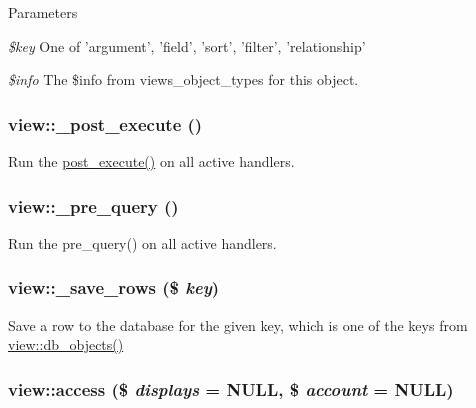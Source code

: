 \begin{DoxyParams}{Parameters}
\item[{\em \$key}]One of 'argument', 'field', 'sort', 'filter', 'relationship' \item[{\em \$info}]The \$info from views\_\-object\_\-types for this object. \end{DoxyParams}
\hypertarget{classview_ad6c1a54c6fe9fc3c32629e575c58ad21}{
\subsubsection[{\_\-post\_\-execute}]{\setlength{\rightskip}{0pt plus 5cm}view::\_\-post\_\-execute ()}}
\label{classview_ad6c1a54c6fe9fc3c32629e575c58ad21}
Run the \hyperlink{classview_ac541f5588453cd52ce0b5c0e0b3443f4}{post\_\-execute()} on all active handlers. \hypertarget{classview_a882fc1813823b4fa361748edaae121ee}{
\subsubsection[{\_\-pre\_\-query}]{\setlength{\rightskip}{0pt plus 5cm}view::\_\-pre\_\-query ()}}
\label{classview_a882fc1813823b4fa361748edaae121ee}
Run the pre\_\-query() on all active handlers. \hypertarget{classview_ac54578fd717de9be8c127add6e869bc2}{
\subsubsection[{\_\-save\_\-rows}]{\setlength{\rightskip}{0pt plus 5cm}view::\_\-save\_\-rows (\$ {\em key})}}
\label{classview_ac54578fd717de9be8c127add6e869bc2}
Save a row to the database for the given key, which is one of the keys from \hyperlink{classview_a1f89288ab73c605c0271c6ce51d980a1}{view::db\_\-objects()} \hypertarget{classview_a996e7b183eb9d43ec9d535dbf897616a}{
\subsubsection[{access}]{\setlength{\rightskip}{0pt plus 5cm}view::access (\$ {\em displays} = {\ttfamily NULL}, \/  \$ {\em account} = {\ttfamily NULL})}}
\label{classview_a996e7b183eb9d43ec9d535dbf897616a}
